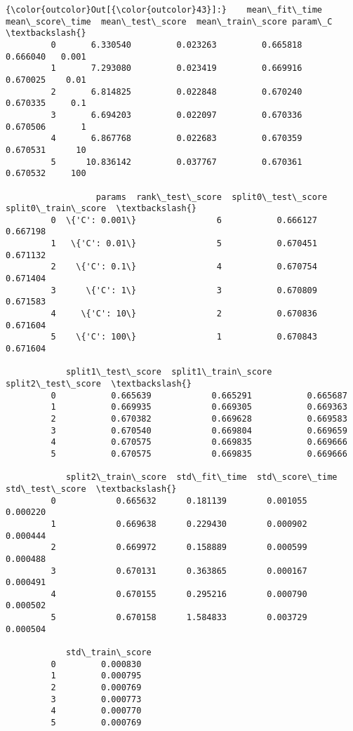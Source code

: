 \documentclass[11pt]{article}
\begin{document}
            \begin{Verbatim}[commandchars=\\\{\}]
{\color{outcolor}Out[{\color{outcolor}43}]:}    mean\_fit\_time  mean\_score\_time  mean\_test\_score  mean\_train\_score param\_C  \textbackslash{}
         0       6.330540         0.023263         0.665818          0.666040   0.001   
         1       7.293080         0.023419         0.669916          0.670025    0.01   
         2       6.814825         0.022848         0.670240          0.670335     0.1   
         3       6.694203         0.022097         0.670336          0.670506       1   
         4       6.867768         0.022683         0.670359          0.670531      10   
         5      10.836142         0.037767         0.670361          0.670532     100   
         
                  params  rank\_test\_score  split0\_test\_score  split0\_train\_score  \textbackslash{}
         0  \{'C': 0.001\}                6           0.666127            0.667198   
         1   \{'C': 0.01\}                5           0.670451            0.671132   
         2    \{'C': 0.1\}                4           0.670754            0.671404   
         3      \{'C': 1\}                3           0.670809            0.671583   
         4     \{'C': 10\}                2           0.670836            0.671604   
         5    \{'C': 100\}                1           0.670843            0.671604   
         
            split1\_test\_score  split1\_train\_score  split2\_test\_score  \textbackslash{}
         0           0.665639            0.665291           0.665687   
         1           0.669935            0.669305           0.669363   
         2           0.670382            0.669628           0.669583   
         3           0.670540            0.669804           0.669659   
         4           0.670575            0.669835           0.669666   
         5           0.670575            0.669835           0.669666   
         
            split2\_train\_score  std\_fit\_time  std\_score\_time  std\_test\_score  \textbackslash{}
         0            0.665632      0.181139        0.001055        0.000220   
         1            0.669638      0.229430        0.000902        0.000444   
         2            0.669972      0.158889        0.000599        0.000488   
         3            0.670131      0.363865        0.000167        0.000491   
         4            0.670155      0.295216        0.000790        0.000502   
         5            0.670158      1.584833        0.003729        0.000504   
         
            std\_train\_score  
         0         0.000830  
         1         0.000795  
         2         0.000769  
         3         0.000773  
         4         0.000770  
         5         0.000769  
\end{Verbatim}
        
\end{document}
